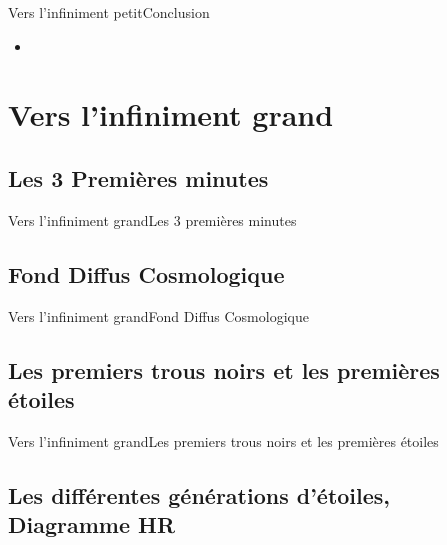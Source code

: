 \documentclass[handout,8pt]{beamer} %
\begin{document}
\begin{frame}{Vers l’infiniment petit}{Conclusion}
	\begin{itemize}
		\item 
		\pause         
	\end{itemize}
\end{frame}


\section{Vers l’infiniment grand}

\begin{frame}
\end{frame}

\subsection{Les 3 Premières minutes}
\begin{frame}{Vers l’infiniment grand}{Les 3 premières minutes}

\end{frame}

\subsection{Fond Diffus Cosmologique}
\begin{frame}{Vers l’infiniment grand}{Fond Diffus Cosmologique}

\end{frame}

\subsection{Les premiers trous noirs et les premières étoiles}
\begin{frame}{Vers l’infiniment grand}{Les premiers trous noirs et les premières étoiles}

\end{frame}

\subsection{Les différentes générations d’étoiles, Diagramme HR}
\end{document}
